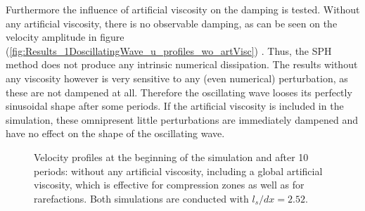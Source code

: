 \documentclass[11pt,a4paper,twoside]{report}
\begin{document}
Furthermore the influence of artificial viscosity on the damping is tested. Without any artificial viscosity, there is no observable damping, as can be seen on the velocity amplitude in figure (\ref{fig:Results_1DoscillatingWave_u_profiles_wo_artVisc}) . Thus, the SPH method does not produce any intrinsic numerical dissipation. The results without any viscosity however is very sensitive to any (even numerical) perturbation, as these are not dampened at all. Therefore the oscillating wave looses its perfectly sinusoidal shape after some periods. If the artificial viscosity is included in the simulation, these omnipresent little perturbations are immediately dampened and have no effect on the shape of the oscillating wave.

\begin{figure}[h]
 \label{fig:Results_1DoscillatingWave_u_profiles}
\centering
{}
\caption[Velocity profiles 1D oscillation]{Velocity profiles at the beginning of the simulation and after 10 periods:  without any artificial viscosity,  including a global artificial viscosity, which is effective for compression zones as well as for rarefactions. Both simulations are conducted with $l_s/dx=2.52$.}

\end{figure}
\end{document}

